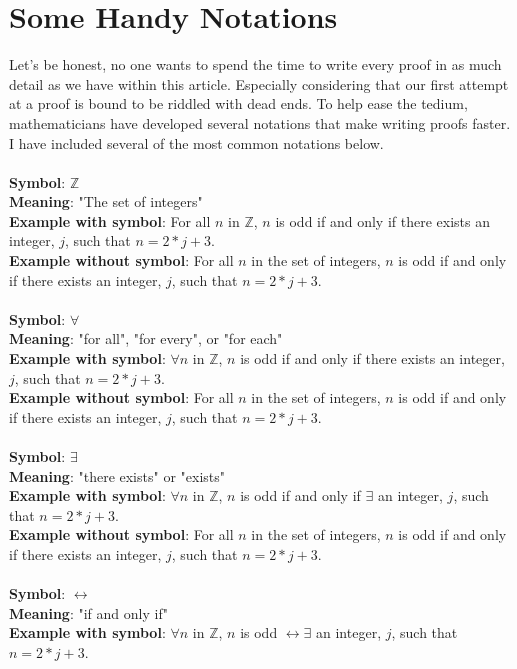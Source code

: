 \documentclass[a4paper,12pt]{article}
\begin{document}
\section{Some Handy Notations}
Let's be honest, no one wants to spend the time to write every proof in as much detail as we have within this article. Especially considering that our first attempt at a proof is bound to be riddled with dead ends. To help ease the tedium, mathematicians have developed several notations that make writing proofs faster. I have included several of the most common notations below.\\
\\
\textbf{Symbol}: $\mathbb{Z}$\\
\textbf{Meaning}: "The set of integers"\\
\textbf{Example with symbol}: For all $n$ in $\mathbb{Z}$, $n$ is odd if and only if there exists an integer, $j$, such that $n = 2*j + 3$.\\
\textbf{Example without symbol}: For all $n$ in the set of integers, $n$ is odd if and only if there exists an integer, $j$, such that $n = 2*j + 3$.\\      
\\
\textbf{Symbol}: $\forall$\\
\textbf{Meaning}: "for all", "for every", or "for each"\\
\textbf{Example with symbol}: $\forall n$ in $\mathbb{Z}$, $n$ is odd if and only if there exists an integer, $j$, such that $n = 2*j + 3$.\\
\textbf{Example without symbol}: For all $n$ in the set of integers, $n$ is odd if and only if there exists an integer, $j$, such that $n = 2*j + 3$.\\ 
\\
\textbf{Symbol}: $\exists$\\
\textbf{Meaning}: "there exists" or "exists"\\
\textbf{Example with symbol}: $\forall n$ in $\mathbb{Z}$, $n$ is odd if and only if $\exists$ an integer, $j$, such that $n = 2*j + 3$.\\
\textbf{Example without symbol}: For all $n$ in the set of integers, $n$ is odd if and only if there exists an integer, $j$, such that $n = 2*j + 3$.\\ 
\\
\textbf{Symbol}: $\leftrightarrow$\\
\textbf{Meaning}: "if and only if"\\
\textbf{Example with symbol}: $\forall n$ in $\mathbb{Z}$, $n$ is odd $\leftrightarrow  \exists$ an integer, $j$, such that $n = 2*j + 3$.\\
\end{document}
